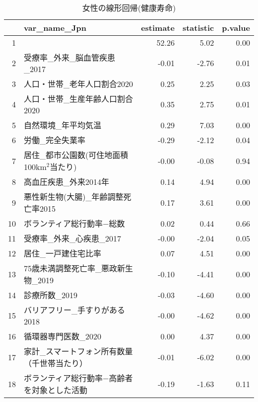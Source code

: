 \begin{table}[ht]
\centering
\caption{女性の線形回帰(健康寿命)} 
\label{UsualHLMLEf}
\begingroup\tiny
\begin{tabular}{rlrrr}
  \hline
 & var\_name\_Jpn & estimate & statistic & p.value \\ 
  \hline
1 &  & 52.26 & 5.02 & 0.00 \\ 
  2 & 受療率\_外来\_脳血管疾患\_2017 & -0.01 & -2.76 & 0.01 \\ 
  3 & 人口・世帯\_老年人口割合2020 & 0.25 & 2.25 & 0.03 \\ 
  4 & 人口・世帯\_生産年齢人口割合2020 & 0.35 & 2.75 & 0.01 \\ 
  5 & 自然環境\_年平均気温 & 0.29 & 7.03 & 0.00 \\ 
  6 & 労働\_完全失業率 & -0.29 & -2.12 & 0.04 \\ 
  7 & 居住\_都市公園数(可住地面積100km$^2$当たり) & -0.00 & -0.08 & 0.94 \\ 
  8 & 高血圧疾患\_外来2014年 & 0.14 & 4.94 & 0.00 \\ 
  9 & 悪性新生物(大腸)\_年齢調整死亡率2015 & 0.17 & 3.61 & 0.00 \\ 
  10 & ボランティア総行動率−総数 & 0.02 & 0.44 & 0.66 \\ 
  11 & 受療率\_外来\_心疾患\_2017 & -0.00 & -2.04 & 0.05 \\ 
  12 & 居住\_一戸建住宅比率 & 0.07 & 4.51 & 0.00 \\ 
  13 & 75歳未満調整死亡率\_悪政新生物\_2019 & -0.10 & -4.41 & 0.00 \\ 
  14 & 診療所数\_2019 & -0.03 & -4.60 & 0.00 \\ 
  15 & バリアフリー\_手すりがある2018 & -0.00 & -4.62 & 0.00 \\ 
  16 & 循環器専門医数\_2020 & 0.00 & 4.37 & 0.00 \\ 
  17 & 家計\_スマートフォン所有数量（千世帯当たり） & -0.01 & -6.02 & 0.00 \\ 
  18 & ボランティア総行動率−高齢者を対象とした活動 & -0.19 & -1.63 & 0.11 \\ 
   \hline
\end{tabular}
\endgroup
\end{table}
